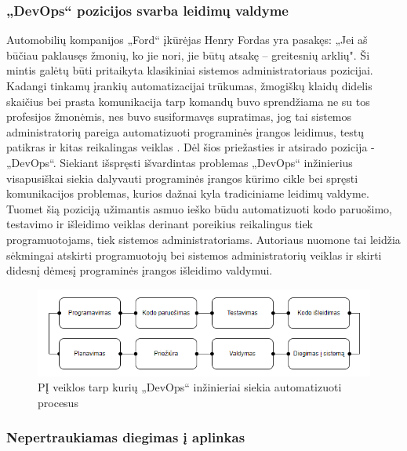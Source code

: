 \documentclass{VUMIFPSkursinis}
\begin{document}
    \subsubsection{„DevOps“ pozicijos svarba leidimų valdyme}

Automobilių kompanijos „Ford“ įkūrėjas Henry Fordas yra pasakęs: „Jei aš būčiau paklausęs žmonių, ko jie nori, jie būtų atsakę – greitesnių arklių". Ši mintis galėtų būti pritaikyta klasikiniai sistemos administratoriaus pozicijai. Kadangi tinkamų įrankių automatizacijai trūkumas, žmogiškų klaidų didelis skaičius bei prasta komunikacija tarp komandų buvo sprendžiama ne su tos profesijos žmonėmis, nes buvo susiformavęs supratimas, jog tai sistemos administratorių pareiga automatizuoti programinės įrangos leidimus, testų patikras ir kitas reikalingas veiklas \cite{SaltTrecias}. Dėl šios priežasties ir atsirado pozicija - „DevOps“. Siekiant išspręsti išvardintas problemas „DevOps“ inžinierius visapusiškai siekia dalyvauti programinės įrangos kūrimo cikle bei spręsti komunikacijos problemas, kurios dažnai kyla tradiciniame leidimų valdyme. Tuomet šią poziciją užimantis asmuo ieško būdu automatizuoti kodo paruošimo, testavimo ir išleidimo veiklas derinant poreikius reikalingus tiek programuotojams, tiek sistemos administratoriams. Autoriaus nuomone tai leidžia sėkmingai atskirti programuotojų bei sistemos administratorių veiklas ir skirti didesnį dėmesį programinės įrangos išleidimo valdymui.

\begin{figure}[H]
    \centering
    \includegraphics[scale=0.8]{img/DevOps.png}
    \caption{PĮ veiklos tarp kurių „DevOps“ inžinieriai siekia automatizuoti procesus}
    \label{img:mlp}
\end{figure}

    \subsubsection{Nepertraukiamas diegimas į aplinkas}
    
\end{document}

